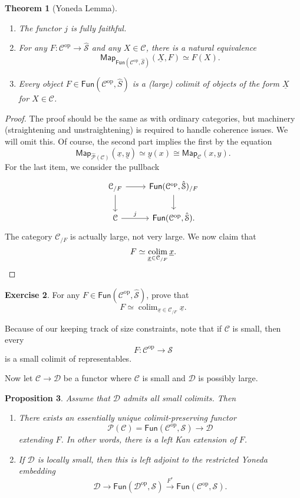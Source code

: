 \documentclass[10pt]{amsart}
\newtheorem{thm}{Theorem}[subsection]
\newtheorem{prop}[thm]{Proposition}
\theoremstyle{definition}
\newtheorem{exer}[thm]{Exercise}
\theoremstyle{remark}
\theoremstyle{plain}
\theoremstyle{definition}
\theoremstyle{remark}
\newcommand{\mc}[1]{\mathcal{#1}}
\newcommand{\ms}[1]{\mathsf{#1}}
\newcommand{\ul}[1]{\underline{#1}}
\newcommand{\1}{\mathbf{1}}
\newcommand{\2}{\mathbf{2}}
\newcommand{\3}{\mathbf{3}}
\DeclareMathOperator{\op}{op}
\DeclareMathOperator*{\colim}{colim}
\begin{document}
\begin{thm}[Yoneda Lemma]\leavevmode
    \begin{enumerate}
        \item The functor $j$ is fully faithful.
        \item For any $F \colon \mc{C}^{\op} \to \hat{\mc{S}}$ and any $X \in \mc{C}$, there is a natural equivalence
        \[ \ms{Map}_{\ms{Fun}(\mc{C}^{\op}, \hat{\mc{S}})}(\ul{X}, F) \simeq F(X). \]
        \item Every object $F \in \ms{Fun}(\mc{C}^{\op}, \hat{S})$ is a (large) colimit of objects of the form $\ul{X}$ for $X \in \mc{C}$.
    \end{enumerate}
\end{thm}

\begin{proof}
    The proof should be the same as with ordinary categories, but machinery (straightening and unstraightening) is required to handle coherence issues. We will omit this. Of course, the second part implies the first by the equation
    \[ \ms{Map}_{\hat{\mc{P}}(\mc{C})}(\ul{x}, \ul{y}) \simeq \ul{y}(x) \cong \ms{Map}_{\mc{C}}(x,y). \]
    For the last item, we consider the pullback
    \begin{equation*}
    \begin{tikzcd}
        \mc{C}_{/F} \ar{r} \ar{d} & \ms{Fun}(\mc{C}^{\op}, \hat{\mc{S}})_{/F} \ar{d} \\
        \mc{C} \ar{r}{j} & \ms{Fun}(\mc{C}^{\op}, \hat{\mc{S}}).
    \end{tikzcd}
    \end{equation*}
    The category $\mc{C}_{/F}$ is actually large, not very large. We now claim that
    \[ F \simeq \colim_{\ul{x} \in \mc{C}_{/F}} \ul{x}. \qedhere \]
\end{proof}

\begin{exer}
    For any $F \in \ms{Fun}(\mc{C}^{\op}, \hat{\mc{S}})$, prove that
    \[ F \simeq \colim_{\ul{x} \in \mc{C}_{/F}} \ul{x}. \]
\end{exer}

Because of our keeping track of size constraints, note that if $\mc{C}$ is small, then every
\[ F \colon \mc{C}^{\op} \to \mc{S} \]
is a small colimit of representables.

Now let $\mc{C} \to \mc{D}$ be a functor where $\mc{C}$ is small and $\mc{D}$ is possibly large.

\begin{prop}
    Assume that $\mc{D}$ admits all small colimits. Then
    \begin{enumerate}
        \item There exists an essentially unique colimit-preserving functor
        \[ \mc{P}(\mc{C}) = \ms{Fun}(\mc{C}^{\op}, \mc{S}) \to \mc{D} \]
        extending $F$. In other words, there is a left Kan extension of $F$.
        \item If $\mc{D}$ is locally small, then this is left adjoint to the restricted Yoneda embedding
        \[ \mc{D} \to \ms{Fun}(\mc{D}^{\op}, \mc{S}) \xrightarrow{F^*} \ms{Fun}(\mc{C}^{\op}, \mc{S}). \]
    \end{enumerate}
\end{prop}
\end{document}
